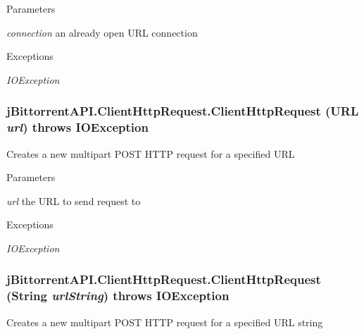 \begin{DoxyParams}{Parameters}
\item[{\em connection}]an already open URL connection \end{DoxyParams}

\begin{DoxyExceptions}{Exceptions}
\item[{\em IOException}]\end{DoxyExceptions}
\hypertarget{classj_bittorrent_a_p_i_1_1_client_http_request_a4a6d962f3543397549d6243c26ec457b}{
\subsubsection[{ClientHttpRequest}]{\setlength{\rightskip}{0pt plus 5cm}jBittorrentAPI.ClientHttpRequest.ClientHttpRequest (URL {\em url})  throws IOException }}
\label{classj_bittorrent_a_p_i_1_1_client_http_request_a4a6d962f3543397549d6243c26ec457b}
Creates a new multipart POST HTTP request for a specified URL


\begin{DoxyParams}{Parameters}
\item[{\em url}]the URL to send request to \end{DoxyParams}

\begin{DoxyExceptions}{Exceptions}
\item[{\em IOException}]\end{DoxyExceptions}
\hypertarget{classj_bittorrent_a_p_i_1_1_client_http_request_aa4b05fd63a277d7b8c3a884621ee49e7}{
\subsubsection[{ClientHttpRequest}]{\setlength{\rightskip}{0pt plus 5cm}jBittorrentAPI.ClientHttpRequest.ClientHttpRequest (String {\em urlString})  throws IOException }}
\label{classj_bittorrent_a_p_i_1_1_client_http_request_aa4b05fd63a277d7b8c3a884621ee49e7}
Creates a new multipart POST HTTP request for a specified URL string



